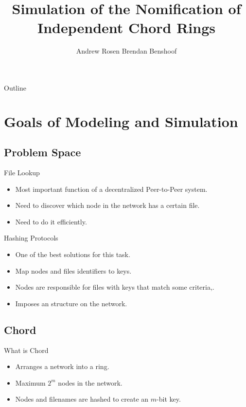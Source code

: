 \documentclass{beamer}
\title{Simulation of the Nomification of Independent Chord Rings}
\author{Andrew Rosen \qquad Brendan Benshoof }
\date{} %
\begin{document}
\begin{frame}
  \titlepage
\end{frame}

\begin{frame}{Outline}
  \tableofcontents
\end{frame}

\section{Goals of Modeling and Simulation}

\subsection{Problem Space}

\begin{frame}{File Lookup}
	\begin{itemize}
		\item Most important function of a decentralized Peer-to-Peer system.
		\item Need to discover which node in the network has a certain file.
		\item Need to do it efficiently.
	\end{itemize}

\end{frame}


\begin{frame}{Hashing Protocols}
	\begin{itemize}
		\item One of the best solutions for this task.
		\item Map nodes and files identifiers to keys.
		\item Nodes are responsible for files with keys that match some criteria,.
		\item Imposes an structure on the network.
	\end{itemize}

\end{frame}


\subsection{Chord}

\begin{frame}{What is Chord}
	\begin{itemize}
		\item Arranges a network into a ring.
		\item Maximum $2^m$ nodes in the network.
		\item Nodes and filenames are hashed to create an $m$-bit key.
	\end{itemize}

\end{frame}
\end{document}
